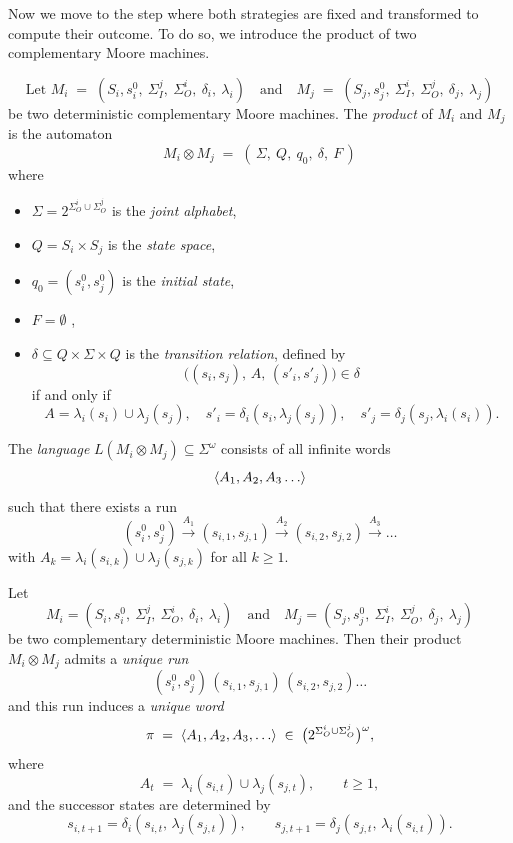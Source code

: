 \documentclass{article}
\begin{document}
  Now we move to the step where both strategies are fixed and transformed to compute their outcome. To do so, we introduce the product of two complementary Moore machines.
  
  
  \begin{definition}
  
  \[\text{Let }
  M_i \;=\; (S_i, s^0_i,\ \Sigma_I^j,\ \Sigma_O^i,\ \delta_i,\ \lambda_i)
  \quad\text{and}\quad
  M_j \;=\; (S_j, s^0_j,\ \Sigma_I^i,\ \Sigma_O^j,\ \delta_j,\ \lambda_j)
  \]
  be two deterministic complementary Moore machines.
  The \emph{product} of $M_i$ and $M_j$ is the automaton
  \[
  M_i \otimes M_j \;=\; (\,\Sigma,\ Q,\ q_0,\ \delta,\ F\,)
  \]
  where
  \begin{itemize}
      \item $\Sigma = 2^{\Sigma_O^i \cup \Sigma_O^j}$ is the \emph{joint alphabet},
      \item $Q = S_i \times S_j$ is the \emph{state space},
      \item $q_0 = (s^0_i, s^0_j)$ is the \emph{initial state},
      \item $F = \emptyset$ ,
      \item $\delta \subseteq Q \times \Sigma \times Q$ is the \emph{transition relation}, defined by
      \[
      \big((s_i,s_j),\, A,\, (s'_i,s'_j)\big) \in \delta
      \]
      if and only if
      \[
      A = \lambda_i(s_i) \cup \lambda_j(s_j), 
      \quad s'_i = \delta_i(s_i,\lambda_j(s_j)), 
      \quad s'_j = \delta_j(s_j,\lambda_i(s_i)).
      \]
  \end{itemize}
  The \emph{language} $L(M_i \otimes M_j) \subseteq \Sigma^\omega$ consists of all infinite words
  \[
  \trace{A_1, A_2, A_3 \dots}
  \]
  such that there exists a run
  \[
  (s^0_i, s^0_j) \xrightarrow{A_1} (s_{i,1}, s_{j,1}) \xrightarrow{A_2} (s_{i,2}, s_{j,2}) \xrightarrow{A_3} \dots
  \]
  with $A_k = \lambda_i(s_{i,k}) \cup \lambda_j(s_{j,k})$ for all $k \geq 1$.
  \end{definition}
  
  
  
  \begin{lemma}
  \label{lem:product-word}
  Let
  \[
  M_i = (S_i, s^0_i,\ \Sigma_I^j,\ \Sigma_O^i,\ \delta_i,\ \lambda_i)
  \quad\text{and}\quad
  M_j = (S_j, s^0_j,\ \Sigma_I^i,\ \Sigma_O^j,\ \delta_j,\ \lambda_j)
  \]
  be two complementary deterministic Moore machines.  
  Then their product $M_i \otimes M_j$ admits a \emph{unique run}
  \[
  (s^0_i,s^0_j)\,(s_{i,1},s_{j,1})\,(s_{i,2},s_{j,2})\dots
  \]
  and this run induces a \emph{unique word}
  \[
  \pi \;=\; \langle A_1,A_2,A_3,\dots \rangle  \;\in\; \big(2^{\Sigma_O^i \cup \Sigma_O^j}\big)^\omega,
  \]
  where
  \[
  A_t \;=\; \lambda_i(s_{i,t}) \cup \lambda_j(s_{j,t}), \qquad t \ge 1,
  \]
  and the successor states are determined by
  \[
  s_{i,t+1} = \delta_i(s_{i,t},\,\lambda_j(s_{j,t})),\qquad
  s_{j,t+1} = \delta_j(s_{j,t},\,\lambda_i(s_{i,t})).
  \]
  \end{lemma}
  
\end{document}
